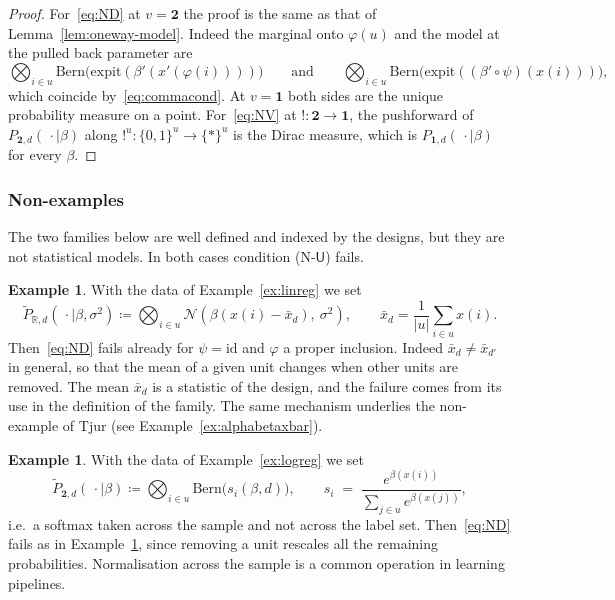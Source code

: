 \documentclass[11pt,a4paper]{article}
\theoremstyle{plain}
\theoremstyle{definition}
\newtheorem{example}[theorem]{Example}
\theoremstyle{remark}
\newcommand{\cat}[1]{\mathsf{#1}}
\newcommand{\catU}{\cat{U}}
\newcommand{\id}{\mathrm{id}}
\newcommand{\R}{\mathbb{R}}
\newcommand{\Norm}{\mathcal{N}}
\newcommand{\Bern}{\mathrm{Bern}}
\newcommand{\expit}{\mathrm{expit}}
\begin{document}
\begin{proof}
For~\eqref{eq:ND} at $v=\mathbf{2}$ the proof is the same as that of
Lemma~\ref{lem:oneway-model}. Indeed the marginal onto $\varphi(u)$ and the
model at the pulled back parameter are
\[
\bigotimes_{i\in u}\Bern\bigl(\expit(\beta'(x'(\varphi(i))))\bigr)
\qquad\text{and}\qquad
\bigotimes_{i\in u}\Bern\bigl(\expit((\beta'\circ\psi)(x(i)))\bigr),
\]
which coincide by~\eqref{eq:commacond}. At $v=\mathbf{1}$ both sides are the
unique probability measure on a point. For~\eqref{eq:NV} at
$!\colon\mathbf{2}\to\mathbf{1}$, the pushforward of
$P_{\mathbf{2},d}(\,\cdot\mid\beta)$ along
$!^{u}\colon\{0,1\}^{u}\to\{*\}^{u}$ is the Dirac measure, which is
$P_{\mathbf{1},d}(\,\cdot\mid\beta)$ for every $\beta$.
\end{proof}

\subsubsection{Non-examples}

The two families below are well defined and indexed by the designs, but they
are not statistical models. In both cases condition (N-$\catU$) fails.

\begin{example}\label{ex:centring}
With the data of Example~\ref{ex:linreg} we set
\[
\widetilde{P}_{\R,d}(\,\cdot\mid\beta,\sigma^{2})
\coloneqq \bigotimes_{i\in u}\Norm(\beta(x(i)-\bar{x}_{d}),\ \sigma^{2}),
\qquad
\bar{x}_{d} = \frac{1}{|u|}\sum_{i\in u} x(i).
\]
Then~\eqref{eq:ND} fails already for $\psi=\id$ and $\varphi$ a proper
inclusion. Indeed $\bar{x}_{d} \neq \bar{x}_{d'}$ in general, so that the mean
of a given unit changes when other units are removed. The mean $\bar{x}_{d}$ is
a statistic of the design, and the failure comes from its use in the definition
of the family. The same mechanism underlies the non-example of Tjur (see
Example~\ref{ex:alphabetaxbar}).
\end{example}

\begin{example}\label{ex:softmax}
With the data of Example~\ref{ex:logreg} we set
\[
\widetilde{P}_{\mathbf{2},d}(\,\cdot\mid\beta)
\coloneqq \bigotimes_{i\in u}\Bern\bigl(s_{i}(\beta,d)\bigr),
\qquad
s_{i} \;=\; \frac{e^{\beta(x(i))}}{\sum_{j\in u}e^{\beta(x(j))}},
\]
i.e.\ a softmax taken across the sample and not across the label set.
Then~\eqref{eq:ND} fails as in Example~\ref{ex:centring}, since removing a unit
rescales all the remaining probabilities. Normalisation across the sample is a
common operation in learning pipelines.
\end{example}
\end{document}
